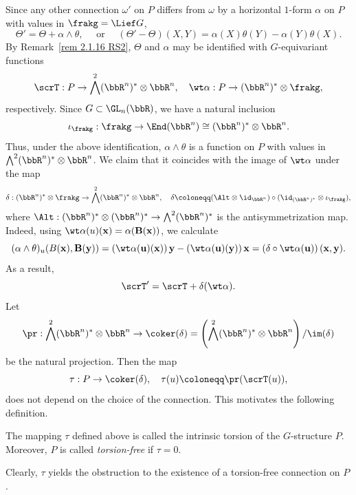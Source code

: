 Since any other connection $\omega'$ on $P$ differs from $\omega$ by a horizontal $1$-form $\alpha$ on $P$ with values in $\frakg=\Lief G$,
\[\Theta'=\Theta+\alpha\wedge\theta,\quad\text{ or }\quad (\Theta'-\Theta)(X,Y)=\alpha(X)\theta(Y)-\alpha(Y)\theta(X).\]
By Remark~\ref{rem 2.1.16 RS2}, $\Theta$ and $\alpha$ may be identified with $G$-equivariant functions 
\[\scrT:P\to \bigwedge^2(\bbR^n)^\ast\otimes\bbR^n,\quad \wt\alpha:P\to (\bbR^n)^\ast\otimes\frakg,\]
respectively. Since $G\subset\GL_n(\bbR)$, we have a natural inclusion 
\[\iota_\frakg:\frakg\to \End(\bbR^n)\cong (\bbR^n)^\ast\otimes\bbR^n.\]
Thus, under the above identification, $\alpha\wedge\theta$ is a function on $P$ with values in $\bigwedge^2(\bbR^n)^\ast\otimes\bbR^n$. We claim that it coincides with the image of $\wt\alpha$ under the map 
\[\delta:(\bbR^n)^\ast\otimes\frakg\to \bigwedge^2(\bbR^n)^\ast\otimes\bbR^n,\quad \delta\coloneqq (\Alt\otimes\id_{\bbR^n})\circ(\id_{(\bbR^n)^\ast}\otimes \iota_\frakg),\]
where $\Alt:(\bbR^n)^\ast\otimes (\bbR^n)^\ast\to \bigwedge^2(\bbR^n)^\ast$ is the antisymmetrization map. Indeed, using $\wt\alpha(u)(\bf{x})=\alpha(B(\bf{x}))$, we calculate 
\[(\alpha\wedge\theta)_u(B(\bf{x}),B(\bf{y}))=\left(\wt\alpha(u)(\bf{x})\right)\bf{y}-\left(\wt\alpha(u)(\bf{y})\right)\bf{x}=\left(\delta\circ\wt\alpha(u)\right)(\bf{x},\bf{y}).\]
As a result,
\[\scrT'=\scrT+\delta(\wt\alpha).\label{eq 2.2.3 RS2}\]
Let 
\[\pr :\bigwedge^2(\bbR^n)^\ast\otimes\bbR^n\to \coker(\delta)=\left(\bigwedge^2(\bbR^n)^\ast\otimes\bbR^n\right)\slash\im(\delta)\]
be the natural projection. Then the map 
\[\tau:P\to \coker(\delta),\quad \tau(u)\coloneqq \pr(\scrT(u)),\]
does not depend on the choice of the connection. This motivates the following definition.

\begin{defn}
    The mapping $\tau$ defined above is called the intrinsic torsion of the $G$-structure $P$. Moreover, $P$ is called \emph{torsion-free} if $\tau=0$.
\end{defn}

Clearly, $\tau$ yields the obstruction to the existence of a torsion-free connection on $P$.

